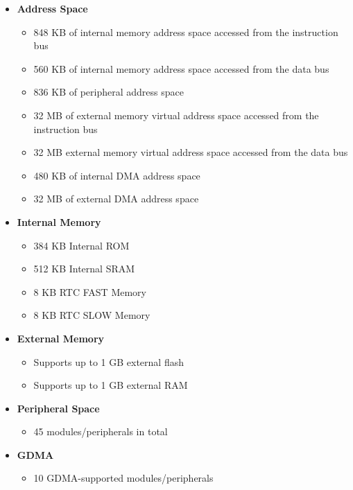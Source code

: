 \documentclass[main\_\_EN.tex]{subfiles}
\begin{document}
\begin{itemize}
    \item {\bfseries Address Space}
        \begin{itemize}
    	    \item 848 KB of internal memory address space accessed from the instruction bus  
    	    \item 560 KB of internal memory address space accessed from the data bus  
    	    \item 836 KB of peripheral address space 
    	    \item 32 MB of external memory virtual address space accessed from the instruction bus
    	    \item 32 MB external memory virtual address space accessed from the data bus
    	    \item 480 KB of internal DMA address space
    	    \item 32 MB of external DMA address space
        \end{itemize}
    \item {\bfseries Internal Memory}
        \begin{itemize}
            \item 384 KB Internal ROM
	        \item 512 KB Internal SRAM
	        \item 8 KB RTC FAST Memory
	        \item 8 KB RTC SLOW Memory
	    \end{itemize}
    \item {\bfseries External Memory}
        \begin{itemize}
            \item Supports up to 1 GB external flash
	        \item Supports up to 1 GB external RAM
	    \end{itemize}
    \item  {\bfseries Peripheral Space}
        \begin{itemize}
           \item  45 modules/peripherals in total
        \end{itemize}
    \item {\bfseries GDMA}
        \begin{itemize}
            \item 10 GDMA-supported modules/peripherals
        \end{itemize}
\end{itemize}
\end{document}

